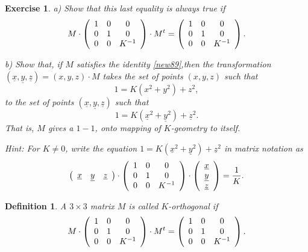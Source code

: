 \documentclass{article}%
\newtheorem{definition}[theorem]{Definition}
\newtheorem{exercise}[theorem]{Exercise}
\begin{document}
\begin{exercise}
\label{87}a) Show that this last equality is always true if%
\begin{equation}
M\cdot\left(
\begin{array}
[c]{ccc}%
1 & 0 & 0\\
0 & 1 & 0\\
0 & 0 & K^{-1}%
\end{array}
\right)  \cdot M^{t}=\left(
\begin{array}
[c]{ccc}%
1 & 0 & 0\\
0 & 1 & 0\\
0 & 0 & K^{-1}%
\end{array}
\right)  . \label{new89}%
\end{equation}


b) Show that, if $M$ satisfies the identity \ref{new89},then the
transformation $\left(  \underline{x},\underline{y},\underline{z}\right)
=\left(  x,y,z\right)  \cdot M$ takes the set of points $\left(  x,y,z\right)
$ such that%
\[
1=K\left(  x^{2}+y^{2}\right)  +z^{2},
\]
to the set of points $\left(  \underline{x},\underline{y},\underline
{z}\right)  $ such that%
\[
1=K\left(  \underline{x}^{2}+\underline{y}^{2}\right)  +\underline{z}^{2}.
\]
That is, $M$ gives a $1-1$, onto mapping of $K$-geometry to itself.

Hint: For $K\neq0$, write the equation $1=K\left(  \underline{x}%
^{2}+\underline{y}^{2}\right)  +\underline{z}^{2}$ in matrix notation as%
\[
\left(
\begin{array}
[c]{ccc}%
\underline{x} & \underline{y} & \underline{z}%
\end{array}
\right)  \cdot\left(
\begin{array}
[c]{ccc}%
1 & 0 & 0\\
0 & 1 & 0\\
0 & 0 & K^{-1}%
\end{array}
\right)  \cdot\left(
\begin{array}
[c]{c}%
\underline{x}\\
\underline{y}\\
\underline{z}%
\end{array}
\right)  =\frac{1}{K}.
\]

\end{exercise}

\begin{definition}
\label{88}A $3\times3$ matrix $M$ is called $K$-orthogonal if
\[
M\cdot\left(
\begin{array}
[c]{ccc}%
1 & 0 & 0\\
0 & 1 & 0\\
0 & 0 & K^{-1}%
\end{array}
\right)  \cdot M^{t}=\left(
\begin{array}
[c]{ccc}%
1 & 0 & 0\\
0 & 1 & 0\\
0 & 0 & K^{-1}%
\end{array}
\right)  .
\]

\end{definition}
\end{document}
